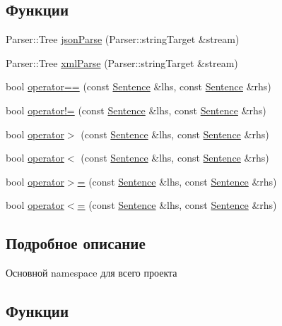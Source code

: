\subsection*{Функции}
\begin{DoxyCompactItemize}
\item 
Parser\+::\+Tree \hyperlink{namespaceJarvis_a317317aef901d7a097472293993d35d0}{json\+Parse} (Parser\+::string\+Target \&stream)
\item 
Parser\+::\+Tree \hyperlink{namespaceJarvis_aee6fb2e55e20f8df7e199e5adbe43fa1}{xml\+Parse} (Parser\+::string\+Target \&stream)
\item 
bool \hyperlink{namespaceJarvis_a333da3058dd9eba2fb455fce8edd2557}{operator==} (const \hyperlink{classJarvis_1_1Sentence}{Sentence} \&lhs, const \hyperlink{classJarvis_1_1Sentence}{Sentence} \&rhs)
\item 
bool \hyperlink{namespaceJarvis_a30effa4f0618d13d82a08b61222841c3}{operator!=} (const \hyperlink{classJarvis_1_1Sentence}{Sentence} \&lhs, const \hyperlink{classJarvis_1_1Sentence}{Sentence} \&rhs)
\item 
bool \hyperlink{namespaceJarvis_ae92529451bff5ef1a8e6117041b0d4eb}{operator$>$} (const \hyperlink{classJarvis_1_1Sentence}{Sentence} \&lhs, const \hyperlink{classJarvis_1_1Sentence}{Sentence} \&rhs)
\item 
bool \hyperlink{namespaceJarvis_a150bb3f2da01868ba25056a7b602420a}{operator$<$} (const \hyperlink{classJarvis_1_1Sentence}{Sentence} \&lhs, const \hyperlink{classJarvis_1_1Sentence}{Sentence} \&rhs)
\item 
bool \hyperlink{namespaceJarvis_a4f81241fea0f46c08819fbbce5b115ed}{operator$>$=} (const \hyperlink{classJarvis_1_1Sentence}{Sentence} \&lhs, const \hyperlink{classJarvis_1_1Sentence}{Sentence} \&rhs)
\item 
bool \hyperlink{namespaceJarvis_a0df10f752b2586fd4069ef999f744c04}{operator$<$=} (const \hyperlink{classJarvis_1_1Sentence}{Sentence} \&lhs, const \hyperlink{classJarvis_1_1Sentence}{Sentence} \&rhs)
\end{DoxyCompactItemize}


\subsection{Подробное описание}
Основной namespace для всего проекта 

\subsection{Функции}
\mbox{\label{namespaceJarvis_a317317aef901d7a097472293993d35d0}} 
